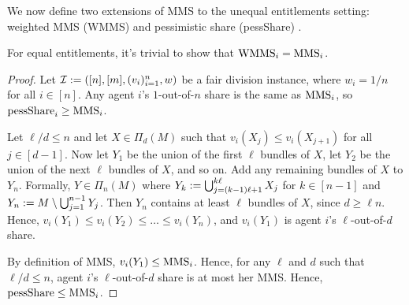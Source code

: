 We now define two extensions of MMS to the unequal entitlements setting:
weighted MMS (WMMS) \citep{farhadi2019fair} and pessimistic share (pessShare) \citep{babaioff2023fair}.


For equal entitlements, it's trivial to show that $\mathrm{WMMS}_i = \mathrm{MMS}_i$.


\begin{proof}
Let $\mathcal{I} := ([n],\allowbreak [m],\allowbreak (v_i)_{i=1}^n,\allowbreak w)$ be a fair division instance,
where $w_i = 1/n$ for all $i \in [n]$.
Any agent $i$'s $1$-out-of-$n$ share is the same as $\mathrm{MMS}_i$, so $\mathrm{pessShare}_i \ge \mathrm{MMS}_i$.

Let $\ell/d \le n$ and let $X \in \Pi_d(M)$ such that $v_i(X_j) \le v_i(X_{j+1})$ for all $j \in [d-1]$.
Now let $Y_1$ be the union of the first $\ell$ bundles of $X$,
let $Y_2$ be the union of the next $\ell$ bundles of $X$, and so on.
Add any remaining bundles of $X$ to $Y_n$.
Formally, $Y \in \Pi_n(M)$ where $Y_k := \bigcup_{j=(k-1)\ell+1}^{k\ell} X_j$ for $k \in [n-1]$
and $Y_n := M \setminus \bigcup_{j=1}^{n-1} Y_j$.
Then $Y_n$ contains at least $\ell$ bundles of $X$, since $d \ge \ell n$.
Hence, $v_i(Y_1) \le v_i(Y_2) \le \ldots \le v_i(Y_n)$,
and $v_i(Y_1)$ is agent $i$'s $\ell$-out-of-$d$ share.

By definition of MMS, $v_i(Y_1) \le \mathrm{MMS}_i$.
Hence, for any $\ell$ and $d$ such that $\ell/d \le n$,
agent $i$'s $\ell$-out-of-$d$ share is at most her MMS.
Hence, $\mathrm{pessShare} \le \mathrm{MMS}_i$.
\end{proof}

